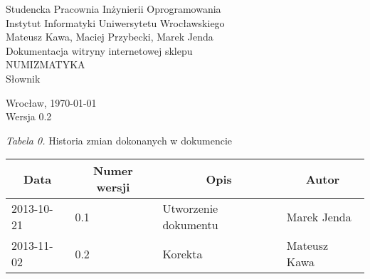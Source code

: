 \documentclass [11pt, a4paper, leqno]	{article}	%
\begin{document}

\begin{center}
	\thispagestyle{empty} 							%
	{\large Studencka Pracownia Inżynierii Oprogramowania} 		\\ [0.5cm]
	{\large Instytut Informatyki Uniwersytetu Wrocławskiego} 	\\ [6.0cm]

	{\large Mateusz Kawa, Maciej Przybecki, Marek Jenda} 		\\ [1.5cm]

	{\huge Dokumentacja witryny internetowej sklepu} 			\\ [0.5cm]
	{\huge NUMIZMATYKA} 										\\ [1.5cm]

	{\large Słownik} 										 	\\ [0.5cm]

	\vfill
	
	{\large Wrocław, \today}									\\ [0.5cm]
	{\large Wersja 0.2}
\end{center}

\newpage


\textit{Tabela 0.} Historia zmian dokonanych w dokumencie

\begin{center}
	\begin{tabular}{| l | l | l | l |}
		\hline
		\multicolumn{1}{|c|}{Data} & 
		\multicolumn{1}{|c|}{Numer wersji} &  
		\multicolumn{1}{|c|}{Opis} &
		\multicolumn{1}{|c|}{Autor} \\ \hline \hline
		2013-10-21 & 0.1 & Utworzenie dokumentu & Marek Jenda \\ \hline
		2013-11-02 & 0.2 & Korekta & Mateusz Kawa \\ \hline
	\end{tabular}
\end{center}
\newpage
\end{document}
